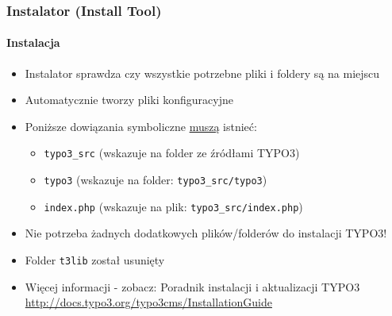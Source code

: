
\begin{frame}[fragile]

	\frametitle{Instalator (Install Tool)}
	\framesubtitle{Instalacja}

	\begin{itemize}
		\item Instalator sprawdza czy wszystkie potrzebne pliki i foldery są na miejscu
		\item Automatycznie tworzy pliki konfiguracyjne
		\item Poniższe dowiązania symboliczne \underline{muszą} istnieć:

		\begin{itemize}
			\item \texttt{typo3\_src}	\tabto{2cm} (wskazuje na folder ze źródłami TYPO3)
			\item \texttt{typo3}		\tabto{2cm} (wskazuje na folder: \texttt{typo3\_src/typo3})
			\item \texttt{index.php}	\tabto{2cm} (wskazuje na plik: \texttt{typo3\_src/index.php})
		\end{itemize}

		\item Nie potrzeba żadnych dodatkowych plików/folderów do instalacji TYPO3!
		\item Folder \texttt{t3lib} został usunięty
		\item Więcej informacji - zobacz: Poradnik instalacji i aktualizacji TYPO3\newline
			\url{http://docs.typo3.org/typo3cms/InstallationGuide}

	\end{itemize}

\end{frame}


